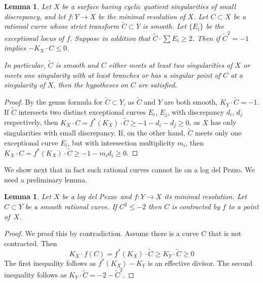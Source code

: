 \documentclass[12pt]{amsbook}
\theoremstyle{plain}
\newtheorem{lem}[thm]{Lemma}
\newcommand{\ldp}{log del Pezzo}
\newcommand{\minres}{minimal resolution}
\newcommand{\wt}[1]{\widetilde #1}
\begin{document}
\begin{lem}\label{lem!badcurve}
Let $X$ be a surface having cyclic quotient singularities of small discrepancy, and let  $f \colon Y \rightarrow X$ be the minimal resolution of $X$. Let $C \subset X$ be a rational curve whose 
strict transform $\widetilde C \subset Y$ is smooth. Let $\{ E_i \}$ be the exceptional locus of $f$. Suppose in addition that 
$\widetilde C \cdot \sum E_i \geq 2$.
Then if $\widetilde C^2 = -1$ implies $-K_X \cdot C \leq 0$.

In particular, $\widetilde C$ is smooth and
$C$ either meets at least two singularities of $X$ or meets one singularity
with at least branches or has a singular point of $C$ at a singularity of $X$,
then the hypotheses on $C$ are satisfied.
\end{lem}
\begin{proof}
By the genus formula for $\widetilde C\subset Y$, as $\widetilde C$ and $Y$ are both smooth,
$K_Y \cdot \widetilde C = -1$. If $\wt C$ intersects two distinct exceptional curves $E_i$, $E_j$,
with discrepancy $d_i$, $d_j$ respectively, then
 $K_X \cdot C = f^*(K_X) \cdot \widetilde C \geq -1 - d_i - d_j  \geq 0$,
 as $X$ has only singularities with small discrepancy. 
 If, on the other hand, $\wt C$ meets only one exceptional curve $E_i$, but with intersection
multiplicity $m_i$, then $K_X \cdot C = f^*(K_X) \cdot \widetilde C \geq -1 - m_id_i  \geq 0$.
\end{proof}

We show next that in fact such rational curves cannot lie on a \ldp.
We need a preliminary lemma.
\begin{lem}\label{lem!minus2curve}
Let $X$ be a \ldp\ and $f \colon Y \rightarrow X$ its \minres.
Let $C\subset Y$ be a smooth rational curve. If $C^2\le-2$ then $C$ is contracted by $f$
to a point of~$X$.
\end{lem}

\begin{proof}
We proof this by contradiction. Assume there is a curve $C$ that is not contracted. Then 
\[
K_X \cdot f(C) = f^*(K_X) \cdot \wt{C} \geq K_Y \cdot \wt{C} \geq 0
\]
The first inequality follows as $f^*(K_X) - K_Y$ is an effective divisor. The second inequality follows as $K_Y \cdot \wt{C} = -2 - \wt{C}^2$.
\end{proof}
\end{document}
